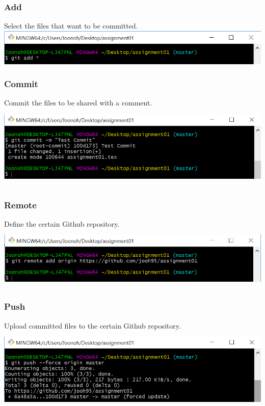 \documentclass[18pt]{article}%
\begin{document}
\subsubsection {Add}
Select the files that want to be committed.\\
\includegraphics[width=15cm]{add.PNG}

\subsubsection {Commit}
Commit the files to be shared with a comment.\\
\includegraphics[height=4cm]{commit.PNG}

\subsubsection {Remote}
Define the certain Github repository.\\
\includegraphics[height=3cm]{remote.PNG}

\subsubsection {Push}
Upload committed files to the certain Github repository.\\
\includegraphics[height=4cm]{push.PNG}
\end{document}
